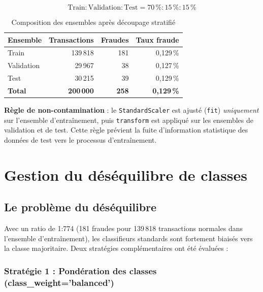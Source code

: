 \documentclass[12pt,a4paper,twoside]{report}
\theoremstyle{definition}
\begin{document}
\begin{equation}
\text{Train} : \text{Validation} : \text{Test} = 70\,\% : 15\,\% : 15\,\%
\label{eq:split}
\end{equation}

\begin{table}[H]
\centering
\caption{Composition des ensembles après découpage stratifié}
\label{tab:split}
\renewcommand{\arraystretch}{1.3}
\begin{tabular}{lrrr}
\toprule
\textbf{Ensemble} & \textbf{Transactions} & \textbf{Fraudes} & \textbf{Taux fraude} \\
\midrule
Train       & 139\,818 & 181 & 0,129\,\% \\
Validation  &  29\,967 &  38 & 0,127\,\% \\
Test        &  30\,215 &  39 & 0,129\,\% \\
\midrule
\textbf{Total} & \textbf{200\,000} & \textbf{258} & \textbf{0,129\,\%} \\
\bottomrule
\end{tabular}
\end{table}

\begin{notebox}
\textbf{Règle de non-contamination} : le \texttt{StandardScaler} est ajusté
(\texttt{fit}) \emph{uniquement} sur l'ensemble d'entraînement, puis
\texttt{transform} est appliqué sur les ensembles de validation et de test.
Cette règle prévient la fuite d'information statistique des données de test
vers le processus d'entraînement.
\end{notebox}

\section{Gestion du déséquilibre de classes}

\subsection{Le problème du déséquilibre}

Avec un ratio de 1:774 (181 fraudes pour 139\,818 transactions normales dans
l'ensemble d'entraînement), les classifieurs standards sont fortement biaisés
vers la classe majoritaire. Deux stratégies complémentaires ont été évaluées :

\subsubsection{Stratégie 1 : Pondération des classes (class\_weight='balanced')}
\end{document}
